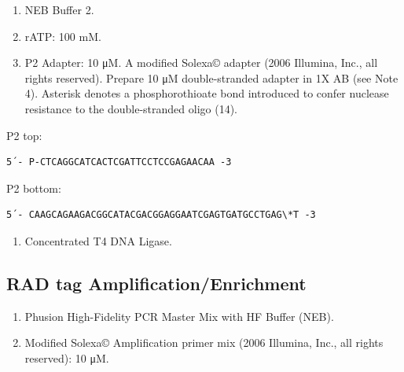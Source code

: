 \documentclass[
  letterpaper,
  DIV=11,
  numbers=noendperiod]{scrreprt}
\providecommand{\tightlist}{%
  \setlength{\itemsep}{0pt}\setlength{\parskip}{0pt}}\usepackage{longtable,booktabs,array}
\begin{document}
\begin{enumerate}
\def\labelenumi{\arabic{enumi}.}
\item
  NEB Buffer 2.
\item
  rATP: 100 mM.
\item
  P2 Adapter: 10 μM. A modified Solexa© adapter (2006 Illumina, Inc.,
  all rights reserved). Prepare 10 μM double-stranded adapter in 1X AB
  (see Note 4). Asterisk denotes a phosphorothioate bond introduced to
  confer nuclease resistance to the double-stranded oligo (14).
\end{enumerate}

\begin{tcolorbox}[enhanced jigsaw, rightrule=.15mm, title=\textcolor{quarto-callout-warning-color}{\faExclamationTriangle}\hspace{0.5em}{NOTES}, titlerule=0mm, opacitybacktitle=0.6, toprule=.15mm, bottomrule=.15mm, opacityback=0, left=2mm, colframe=quarto-callout-warning-color-frame, breakable, coltitle=black, colback=white, colbacktitle=quarto-callout-warning-color!10!white, bottomtitle=1mm, leftrule=.75mm, toptitle=1mm, arc=.35mm]

P2 top:

\begin{verbatim}
5´- P-CTCAGGCATCACTCGATTCCTCCGAGAACAA -3
\end{verbatim}

P2 bottom:

\begin{verbatim}
5´- CAAGCAGAAGACGGCATACGACGGAGGAATCGAGTGATGCCTGAG\*T -3
\end{verbatim}

\end{tcolorbox}

\begin{enumerate}
\def\labelenumi{\arabic{enumi}.}
\setcounter{enumi}{3}
\tightlist
\item
  Concentrated T4 DNA Ligase.
\end{enumerate}

\hypertarget{rad-tag-amplificationenrichment}{%
\subsection{RAD tag
Amplification/Enrichment}\label{rad-tag-amplificationenrichment}}

\begin{enumerate}
\def\labelenumi{\arabic{enumi}.}
\tightlist
\item
  Phusion High-Fidelity PCR Master Mix with HF Buffer (NEB).
\item
  Modified Solexa© Amplification primer mix (2006 Illumina, Inc., all
  rights reserved): 10 μM.
\end{enumerate}
\end{document}
